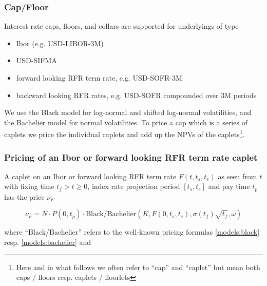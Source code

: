 \subsubsection{Cap/Floor}
\label{pricing:ir_capfloor}

Interest rate caps, floors, and collars are supported for underlyings of type

\begin{itemize}
\item Ibor (e.g. USD-LIBOR-3M)
\item USD-SIFMA
\item forward looking RFR term rate, e.g. USD-SOFR-3M
\item backward looking RFR rates, e.g. USD-SOFR compounded over 3M periods
\end{itemize}

We use the Black model for log-normal and shifted log-normal volatilities, and the Bachelier model for normal
volatilities. To price a cap which is a series of caplets we price the individual caplets and add up the NPVs of the
caplets\footnote{Here and in what follows we often refer to ``cap'' and ``caplet'' but mean both caps / floors resp. caplets /
floorlets}.

\subsubsection{Pricing of an Ibor or forward looking RFR term rate caplet}

A caplet on an Ibor or forward looking RFR term rate $F(t, t_s, t_e)$ as seen from $t$ with fixing time $t_f > t \geq
0$, index rate projection period $[t_s, t_e]$ and pay time $t_p$ has the price $\nu_F$

\begin{equation}
\label{pricing:ir_capfloor_ibor_caplet}
\nu_F = N \cdot P(0,t_p) \cdot \text{Black/Bachelier}(K, F(0, t_s, t_e), \sigma(t_f) \sqrt{t_f}, \omega)
\end{equation}

where ``Black/Bachelier'' refers to the well-known pricing formulas \ref{models:black} resp. \ref{models:bachelier} and

